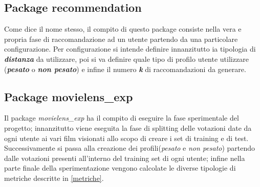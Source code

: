 \subsection{Package recommendation}
Come dice il nome stesso, il compito di questo package consiste nella vera e propria fase di raccomandazione ad un utente partendo da una particolare configurazione. Per configurazione si intende definire innanzitutto ia tipologia di \emph{\textbf{distanza}} da utilizzare, poi si va definire quale tipo di profilo utente utilizzare (\emph{\textbf{pesato}} o \emph{\textbf{non pesato}}) e infine il numero \emph{\textbf{k}} di raccomandazioni da generare.

\subsection{Package movielens\_exp}
Il package \emph{movielens\_exp} ha il compito di eseguire la fase sperimentale del progetto; innanzitutto viene eseguita la fase di splitting delle votazioni date da ogni utente ai vari film visionati allo scopo di creare i set di training e di test. Successivamente si passa alla creazione dei profili(\emph{pesato} e \emph{non pesato}) partendo dalle votazioni presenti all'interno del training set di ogni utente; infine nella parte finale della sperimentazione vengono calcolate le diverse tipologie di metriche descritte in \ref{metriche}.


